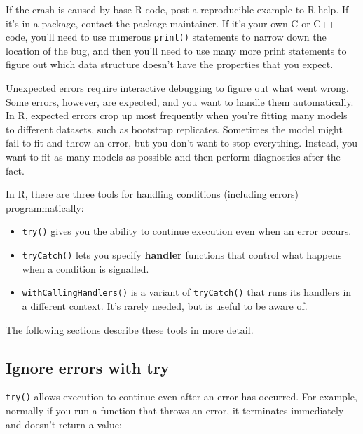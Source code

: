 \begin{itemize}
  If the crash is caused by base R code, post a reproducible example to
  R-help. If it's in a package, contact the package maintainer. If it's
  your own C or C++ code, you'll need to use numerous \texttt{print()}
  statements to narrow down the location of the bug, and then you'll
  need to use many more print statements to figure out which data
  structure doesn't have the properties that you expect.
\end{itemize}


Unexpected errors require interactive debugging to figure out what went
wrong. Some errors, however, are expected, and you want to handle them
automatically. In R, expected errors crop up most frequently when you're
fitting many models to different datasets, such as bootstrap replicates.
Sometimes the model might fail to fit and throw an error, but you don't
want to stop everything. Instead, you want to fit as many models as
possible and then perform diagnostics after the fact. 

In R, there are three tools for handling conditions (including errors)
programmatically:

\begin{itemize}
\item
  \texttt{try()} gives you the ability to continue execution even when
  an error occurs.
\item
  \texttt{tryCatch()} lets you specify \textbf{handler} functions that
  control what happens when a condition is signalled.
\item
  \texttt{withCallingHandlers()} is a variant of \texttt{tryCatch()}
  that runs its handlers in a different context. It's rarely needed, but
  is useful to be aware of.
\end{itemize}

The following sections describe these tools in more detail.

\subsection{Ignore errors with try}\label{try}

\texttt{try()} allows execution to continue even after an error has
occurred. For example, normally if you run a function that throws an
error, it terminates immediately and doesn't return a value:

